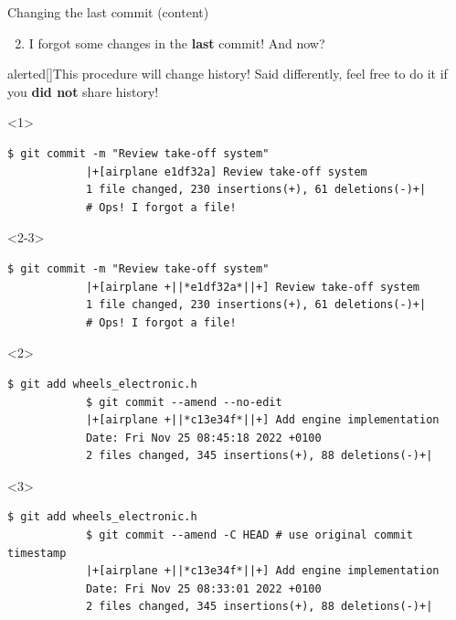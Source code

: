 \documentclass[usenames,svgnames,14pt]{beamer}
\begin{document}
\begin{frame}[fragile]{Changing the last commit (content)}
    \begin{enumerate}
        \setcounter{enumi}{1}
        \item I forgot some changes in the \textbf{last} commit! And now?
    \end{enumerate}
    \begin{varblock}{alerted}[\textwidth]{This procedure will change history!}
        Said differently, feel free to do it if you \alert{\textbf{did not}} share history!
    \end{varblock}
    \vspace{3mm}
    \begin{onlyenv}<1>
        \begin{lstlisting}[style=MyBash]
            $ git commit -m "Review take-off system"
            |+[airplane e1df32a] Review take-off system
            1 file changed, 230 insertions(+), 61 deletions(-)+|
            # Ops! I forgot a file!
        \end{lstlisting}
    \end{onlyenv}
    \begin{onlyenv}<2-3>
        \begin{lstlisting}[style=MyBash]
            $ git commit -m "Review take-off system"
            |+[airplane +||*e1df32a*||+] Review take-off system
            1 file changed, 230 insertions(+), 61 deletions(-)+|
            # Ops! I forgot a file!
        \end{lstlisting}
    \end{onlyenv}
    \begin{onlyenv}<2>
        \begin{lstlisting}[style=MyBash]
            $ git add wheels_electronic.h
            $ git commit --amend --no-edit
            |+[airplane +||*c13e34f*||+] Add engine implementation
            Date: Fri Nov 25 08:45:18 2022 +0100
            2 files changed, 345 insertions(+), 88 deletions(-)+|
        \end{lstlisting}
    \end{onlyenv}
    \begin{onlyenv}<3>
    \begin{lstlisting}[style=MyBash]
            $ git add wheels_electronic.h
            $ git commit --amend -C HEAD # use original commit timestamp
            |+[airplane +||*c13e34f*||+] Add engine implementation
            Date: Fri Nov 25 08:33:01 2022 +0100
            2 files changed, 345 insertions(+), 88 deletions(-)+|
        \end{lstlisting}
    \end{onlyenv}
\end{frame}
\end{document}
